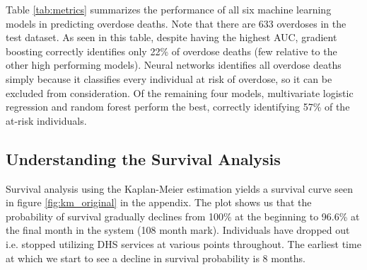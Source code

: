 \documentclass[twoside,10.5pt]{article}
\begin{document}
\begin{table}[h!]
  \begin{center}
    \caption{Evaluation Metrics of the Machine Learning Models}
    \label{tab:metrics}
  \end{center}
\end{table}

Table \ref{tab:metrics} summarizes the performance of all six machine learning models in predicting overdose deaths. Note that there are 633 overdoses in the test dataset. As seen in this table, despite having the highest AUC, gradient boosting correctly identifies only 22\% of overdose deaths (few relative to the other high performing models). Neural networks identifies all overdose deaths simply because it classifies every individual at risk of overdose, so it can be excluded from consideration. Of the remaining four models, multivariate logistic regression and random forest perform the best, correctly identifying 57\% of the at-risk individuals. 

\subsection{Understanding the Survival Analysis}
Survival analysis using the Kaplan-Meier estimation yields a survival curve seen in figure \ref{fig:km_original} in the appendix. The plot shows us that the probability of survival gradually declines from 100\% at the beginning to 96.6\% at the final month in the system (108 month mark). Individuals have dropped out i.e. stopped utilizing DHS services at various points throughout. The earliest time at which we start to see a decline in survival probability is 8 months.\\
\end{document}
